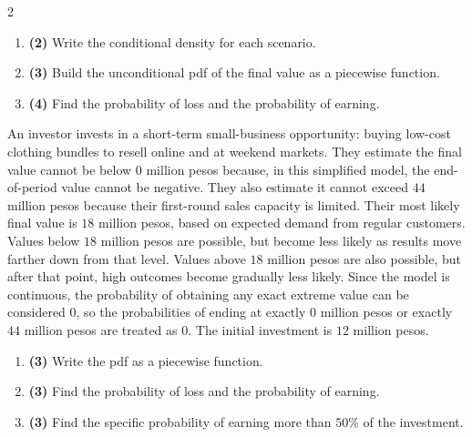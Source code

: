 \begin{multicols}{2}
		
		\begin{enumerate}[label=\textbf{\alph*)}]
			\item \textbf{(2)} Write the conditional density for each scenario.
			\item \textbf{(3)} Build the unconditional pdf of the final value as a piecewise function.
			\item \textbf{(4)} Find the probability of loss and the probability of earning.
		\end{enumerate}
		
		\vspace{0.25cm}
		\vspace{-0.3cm}
		An investor invests in a short-term small-business opportunity: buying low-cost clothing bundles to resell online and at weekend markets. They estimate the final value cannot be below $0$ million pesos because, in this simplified model, the end-of-period value cannot be negative. They also estimate it cannot exceed $44$ million pesos because their first-round sales capacity is limited. Their most likely final value is $18$ million pesos, based on expected demand from regular customers. Values below $18$ million pesos are possible, but become less likely as results move farther down from that level. Values above $18$ million pesos are also possible, but after that point, high outcomes become gradually less likely. Since the model is continuous, the probability of obtaining any exact extreme value can be considered $0$, so the probabilities of ending at exactly $0$ million pesos or exactly $44$ million pesos are treated as $0$. The initial investment is $12$ million pesos.
		

		\begin{enumerate}[label=\textbf{\alph*)}]
			\item \textbf{(3)} Write the pdf as a piecewise function.
			\item \textbf{(3)} Find the probability of loss and the probability of earning.
			\item \textbf{(3)} Find the specific probability of earning more than \(50\%\) of the investment.
		\end{enumerate}
		
		\vspace{-0.3cm}

		


\end{multicols}
